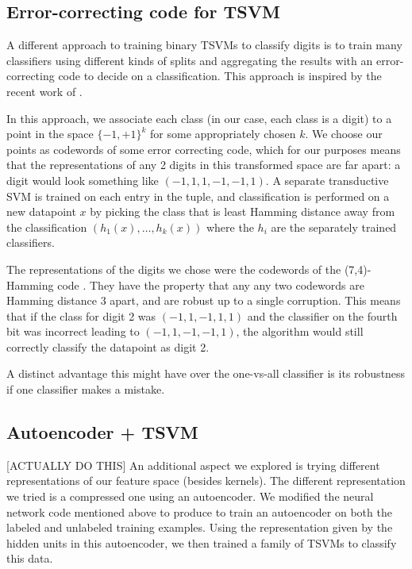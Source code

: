 \documentclass[11pt]{article}
\begin{document}
\subsection{Error-correcting code for TSVM}
\label{codes}
A different approach to training binary TSVMs to classify digits is  to train many classifiers using different kinds of splits and aggregating the results with an error-correcting code to decide on a classification. This approach is inspired by the recent work of \cite{DBLP:journals/corr/BalcanDM15}.

In this approach, we associate each class (in our case, each class
is a digit) to a point in the space $\{-1,+1\}^k$
for some appropriately chosen $k$. We choose our points as codewords
of some error correcting code, which for our purposes means that the
representations of any 2 digits in this transformed space are
far apart: a digit would look something like $(-1,1,1,-1,-1,1)$.
A separate transductive SVM is trained on each entry in the tuple,
and classification is performed on a new datapoint $x$ by picking the
class that is least Hamming distance away from the classification
$(h_1(x),\ldots,h_k(x))$ where the $h_i$ are the separately trained
classifiers.

The representations of the digits we chose were the codewords of the
(7,4)-Hamming code \cite{macwilliams1977theory}. They have the property that any
any two codewords are Hamming distance 3 apart, and are robust up to
a single corruption. This means that if the class for digit 2 was
$(-1,1,-1,1,1)$ and the classifier on the fourth bit was incorrect
leading to $(-1,1,-1,-1,1)$, the algorithm would still correctly
classify the datapoint as digit 2.

A distinct advantage this might have over the one-vs-all
classifier is its robustness if one classifier makes a mistake.

\subsection{Autoencoder + TSVM}

[ACTUALLY DO THIS] An additional aspect we explored is trying different representations of our feature space (besides kernels). The different representation we tried is a compressed one using an autoencoder. We modified the neural network code mentioned above to produce to train an autoencoder on both the labeled and unlabeled training examples. Using the representation given by the hidden units in this autoencoder, we then trained a family of TSVMs to classify this data.
\end{document}
